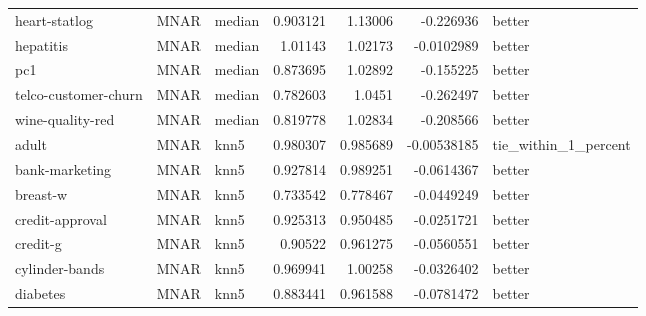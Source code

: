 \begin{table}[ht]
\begin{tabular}{lllrrrl}
 heart-statlog        & MNAR        & median           &                                 0.903121 &                             1.13006  &                    -0.226936   & better               \\
 hepatitis            & MNAR        & median           &                                 1.01143  &                             1.02173  &                    -0.0102989  & better               \\
 pc1                  & MNAR        & median           &                                 0.873695 &                             1.02892  &                    -0.155225   & better               \\
 telco-customer-churn & MNAR        & median           &                                 0.782603 &                             1.0451   &                    -0.262497   & better               \\
 wine-quality-red     & MNAR        & median           &                                 0.819778 &                             1.02834  &                    -0.208566   & better               \\
 adult                & MNAR        & knn5             &                                 0.980307 &                             0.985689 &                    -0.00538185 & tie\_within\_1\_percent \\
 bank-marketing       & MNAR        & knn5             &                                 0.927814 &                             0.989251 &                    -0.0614367  & better               \\
 breast-w             & MNAR        & knn5             &                                 0.733542 &                             0.778467 &                    -0.0449249  & better               \\
 credit-approval      & MNAR        & knn5             &                                 0.925313 &                             0.950485 &                    -0.0251721  & better               \\
 credit-g             & MNAR        & knn5             &                                 0.90522  &                             0.961275 &                    -0.0560551  & better               \\
 cylinder-bands       & MNAR        & knn5             &                                 0.969941 &                             1.00258  &                    -0.0326402  & better               \\
 diabetes             & MNAR        & knn5             &                                 0.883441 &                             0.961588 &                    -0.0781472  & better               \\

\end{tabular}
\end{table}
